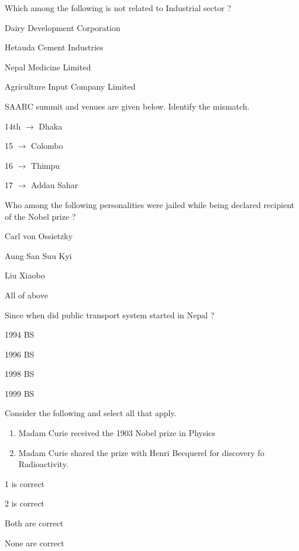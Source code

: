 \begin{questions}
\question Which among the following is not related to Industrial sector ?
  \begin{items}
  \item Dairy Development Corporation
  \item Hetauda Cement Industries
  \item Nepal Medicine Limited
  \item* Agriculture Input Company Limited
  \end{items}

\question SAARC summit and venues are given below. Identify the mismatch.
  \begin{items}
  \item* 14th $\longrightarrow$ Dhaka
  \item 15 $\longrightarrow$ Colombo
  \item 16 $\longrightarrow$ Thimpu
  \item 17 $\longrightarrow$ Addau Sahar
  \end{items}

\question Who among the following personalities were jailed while being declared recipient of the Nobel prize ?
  \begin{items}
  \item Carl von Ossietzky
  \item Aung San Suu Kyi
  \item Liu Xiaobo
  \item* All of above
  \end{items}

\question Since when did public transport system started in Nepal ?
  \begin{items}
  \item 1994 BS
  \item 1996 BS
  \item 1998 BS
  \item 1999 BS
  \end{items}

\question Consider the following and select all that apply.
  \begin{enumerate}
  \item Madam Curie received the 1903 Nobel prize in Physics
  \item Madam Curie shared the prize with Henri Becquerel for discovery fo Radioactivity.
  \end{enumerate}

  \begin{items}
  \item 1 is correct
  \item 2 is correct
  \item* Both are correct
  \item None are correct
  \end{items}


\end{questions}
